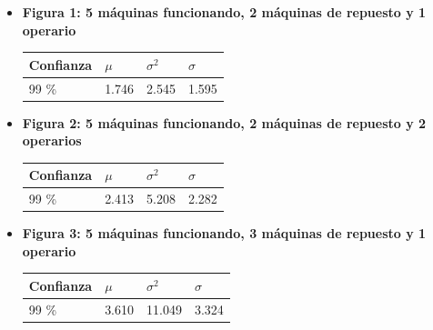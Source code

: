     \begin{itemize}
      \item \textbf{Figura 1: 5 máquinas funcionando, 2 máquinas de repuesto y 1 operario}
        \begin{center}
          \begin{tabular}{| l | l | l | l |}
          \hline
            Confianza & $\mu$ & $\sigma^2$ & $\sigma$ \\\hline\hline
            99 \% & 1.746 & 2.545 & 1.595 \\\hline
          \end{tabular}
        \end{center}
      \vspace{5mm}
      \item \textbf{Figura 2: 5 máquinas funcionando, 2 máquinas de repuesto y 2 operarios}
        \begin{center}
          \begin{tabular}{| l | l | l | l |}
          \hline
            Confianza & $\mu$ & $\sigma^2$ & $\sigma$ \\\hline\hline
            99 \% & 2.413 & 5.208 & 2.282 \\\hline
          \end{tabular}
        \end{center}
      \vspace{5mm}
      \item \textbf{Figura 3: 5 máquinas funcionando, 3 máquinas de repuesto y 1 operario}
        \begin{center}
          \begin{tabular}{| l | l | l | l |}
          \hline
            Confianza & $\mu$ & $\sigma^2$ & $\sigma$ \\\hline\hline
            99 \% & 3.610 & 11.049 & 3.324 \\\hline
          \end{tabular}
        \end{center}
    \end{itemize}
